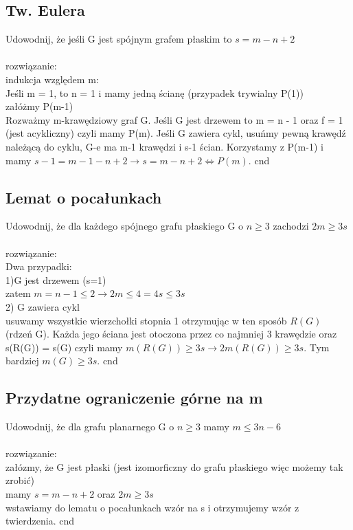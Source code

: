 \documentclass{article}
\begin{document}
\subsection*{Tw. Eulera}
Udowodnij, że jeśli G jest spójnym grafem płaskim to $s = m - n + 2$\\\\ rozwiązanie: \\
indukcja względem m: \\
Jeśli m = 1, to n = 1 i mamy jedną ścianę (przypadek trywialny P(1)) \\
załóżmy P(m-1) \\
Rozważmy m-krawędziowy graf G.
Jeśli G jest drzewem to m = n - 1 oraz f = 1 (jest acykliczny) czyli mamy P(m).
Jeśli G zawiera cykl, usuńmy pewną krawędź należącą do cyklu,  G-e ma m-1 krawędzi i s-1 ścian.
Korzystamy z P(m-1) i mamy $s-1 = m-1 - n + 2 \rightarrow s = m - n + 2 \iff P(m)$. cnd

\subsection*{Lemat o pocałunkach}
Udowodnij, że dla każdego spójnego grafu płaskiego G o $n \geq 3$ zachodzi $2m \geq 3s$ \\\\rozwiązanie: \\
Dwa przypadki: \\
1)G jest drzewem (s=1)\\
zatem $m = n - 1 \leq 2 \rightarrow 2m \leq 4 = 4s \leq 3s$ \\
2) G zawiera cykl \\
usuwamy wszystkie wierzchołki stopnia 1 otrzymując w ten sposób $R(G)$ (rdzeń G). Każda jego ściana
jest otoczona przez co najmniej 3 krawędzie oraz s(R(G)) = s(G) czyli mamy $m(R(G))\geq 3s \rightarrow 2m(R(G)) \geq 3s$. 
Tym bardziej $m(G) \geq 3s$. cnd 

\subsection*{Przydatne ograniczenie górne na m}
Udowodnij, że dla grafu planarnego G o $n\geq 3$ mamy $m \leq 3n-6$ \\\\ rozwiązanie: \\
załózmy, że G jest płaski (jest izomorficzny do grafu płaskiego więc możemy tak zrobić) \\
mamy $s = m - n + 2$ oraz $2m \geq 3s$ \\
wstawiamy do lematu o pocałunkach wzór na s i otrzymujemy wzór z twierdzenia.  cnd
\end{document}
